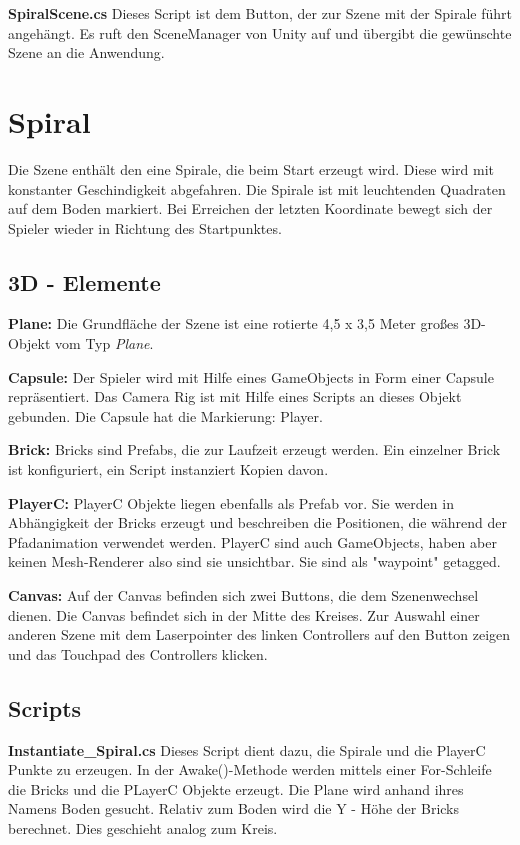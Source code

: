 \textbf{SpiralScene.cs}
Dieses Script ist dem Button, der zur Szene mit der Spirale führt angehängt. Es ruft den SceneManager von Unity auf und übergibt die gewünschte Szene an die Anwendung.

\section{Spiral}
\label{Spirale}

Die Szene enthält den eine Spirale, die beim Start erzeugt wird. Diese wird mit konstanter Geschindigkeit abgefahren. Die Spirale ist mit leuchtenden Quadraten auf dem Boden markiert. Bei Erreichen der letzten Koordinate bewegt sich der Spieler wieder in Richtung des Startpunktes. 

\subsection{3D - Elemente}

\textbf{Plane: } Die Grundfläche der Szene ist eine rotierte 4,5 x 3,5 Meter großes 3D-Objekt vom Typ \emph{Plane}.

\textbf{Capsule: } Der Spieler wird mit Hilfe eines GameObjects in Form einer Capsule repräsentiert. Das Camera Rig ist mit Hilfe eines Scripts an dieses Objekt gebunden. Die Capsule hat die Markierung: Player.

\textbf{Brick: } Bricks sind Prefabs, die zur Laufzeit erzeugt werden. Ein einzelner Brick ist konfiguriert, ein Script instanziert Kopien davon.

\textbf{PlayerC: } PlayerC Objekte liegen ebenfalls als Prefab vor. Sie werden in Abhängigkeit der Bricks erzeugt und beschreiben die Positionen, die während der Pfadanimation verwendet werden. PlayerC sind auch GameObjects, haben aber keinen Mesh-Renderer also sind sie unsichtbar. Sie sind als "waypoint" getagged.

\textbf{Canvas: } Auf der Canvas befinden sich zwei Buttons, die dem Szenenwechsel dienen. Die Canvas befindet sich in der Mitte des Kreises. Zur Auswahl einer anderen Szene mit dem Laserpointer des linken Controllers auf den Button zeigen und das Touchpad des Controllers klicken. 

\subsection{Scripts}
\textbf{Instantiate\_Spiral.cs}
Dieses Script dient dazu, die Spirale und die PlayerC Punkte zu erzeugen. In der Awake()-Methode werden mittels einer For-Schleife die Bricks und die PLayerC Objekte erzeugt. Die Plane wird anhand ihres Namens \glqq Boden{}\grqq{} gesucht. Relativ zum Boden wird die Y - Höhe der Bricks berechnet. Dies geschieht analog zum Kreis.

